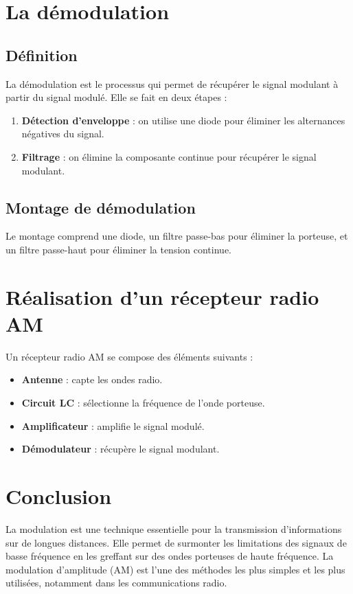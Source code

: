 \documentclass[12pt]{article}
\begin{document}
\section{La démodulation}

\subsection{Définition}

La démodulation est le processus qui permet de récupérer le signal modulant à partir du signal modulé. Elle se fait en deux étapes :

\begin{enumerate}
    \item \textbf{Détection d’enveloppe} : on utilise une diode pour éliminer les alternances négatives du signal.
    \item \textbf{Filtrage} : on élimine la composante continue pour récupérer le signal modulant.
\end{enumerate}

\subsection{Montage de démodulation}

Le montage comprend une diode, un filtre passe-bas pour éliminer la porteuse, et un filtre passe-haut pour éliminer la tension continue.

\section{Réalisation d’un récepteur radio AM}

Un récepteur radio AM se compose des éléments suivants :

\begin{itemize}
    \item \textbf{Antenne} : capte les ondes radio.
    \item \textbf{Circuit LC} : sélectionne la fréquence de l’onde porteuse.
    \item \textbf{Amplificateur} : amplifie le signal modulé.
    \item \textbf{Démodulateur} : récupère le signal modulant.
\end{itemize}

\section*{Conclusion}

La modulation est une technique essentielle pour la transmission d’informations sur de longues distances. Elle permet de surmonter les limitations des signaux de basse fréquence en les greffant sur des ondes porteuses de haute fréquence. La modulation d’amplitude (AM) est l’une des méthodes les plus simples et les plus utilisées, notamment dans les communications radio.
\end{document}
